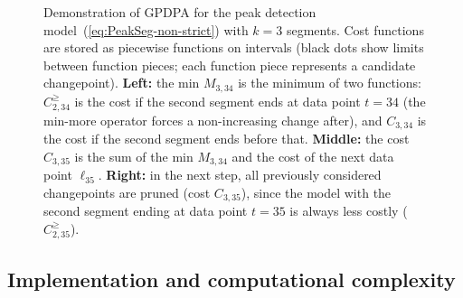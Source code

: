 \documentclass[twoside,11pt]{article}
\begin{document}
\begin{figure}[t!]
  \centering
  
\vskip -1cm
  \caption{
    Demonstration of GPDPA for the peak detection model~(\ref{eq:PeakSeg-non-strict})
    with $k=3$ segments. Cost functions are stored as piecewise
    functions on intervals (black dots show limits between function
    pieces; each function piece represents a candidate changepoint). 
    \textbf{Left:} the min \textcolor{Min}{$M_{3,34}$} is the
    minimum of two functions: \textcolor{MinMore}{$C^{\geq}_{2,34}$}
    is the cost if the second segment ends at data point $t=34$ (the
    min-more operator forces a non-increasing change after), and
    \textcolor{Ckt}{$C_{3,34}$} is the cost if the second segment ends
    before that. \textbf{Middle:} the cost \textcolor{Ckt}{$C_{3,35}$}
    is the sum of the min \textcolor{Min}{$M_{3,34}$} and the cost of
    the next data point \textcolor{Data}{$\ell_{35}$}. \textbf{Right:}
    in the next step, all previously considered changepoints are
    pruned (cost \textcolor{Ckt}{$C_{3,35}$}), since the model with the second
    segment ending at data point $t=35$ is always less costly
    (\textcolor{MinMore}{$C^{\geq}_{2,35}$}).  }
  \label{fig:min-envelope}
\end{figure}

\subsection{Implementation and computational complexity}
\end{document}

